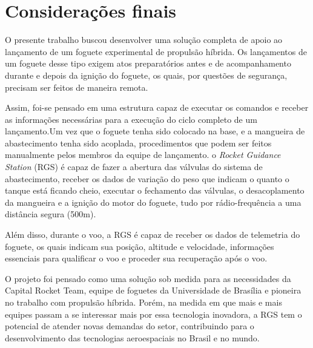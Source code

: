 \chapter{Considerações finais}

O presente trabalho buscou desenvolver uma solução completa de apoio ao lançamento de um foguete experimental de propulsão híbrida. Os lançamentos de um foguete desse tipo exigem atos preparatórios antes e de acompanhamento durante e depois da ignição do foguete, os quais, por questões de segurança, precisam ser feitos de maneira remota.
\par Assim, foi-se pensado em uma estrutura capaz de executar os comandos e receber as informações necessárias para a execução do ciclo completo de um lançamento.Um vez que o foguete tenha sido colocado na base, e a mangueira de abastecimento tenha sido acoplada, procedimentos que podem ser feitos manualmente pelos membros da equipe de lançamento. o \textit{Rocket Guidance Station} (RGS) é capaz de fazer a abertura das válvulas do sistema de abastecimento, receber os dados de variação do peso que indicam o quanto o tanque está ficando cheio, executar o fechamento das válvulas, o desacoplamento da mangueira e a ignição do motor do foguete, tudo por rádio-frequência a uma distância segura (500m).
\par Além disso, durante o voo, a RGS é capaz de receber os dados de telemetria do foguete, os quais indicam sua posição, altitude e velocidade, informações essenciais para qualificar o voo e proceder sua recuperação após o voo.
\par O projeto foi pensado como uma solução sob medida para as necessidades da Capital Rocket Team, equipe de foguetes da Universidade de Brasília e pioneira no trabalho com propulsão híbrida. Porém, na medida em que mais e mais equipes passam a se interessar mais por essa tecnologia inovadora, a RGS tem o potencial de atender novas demandas do setor, contribuindo para o desenvolvimento das tecnologias aeroespaciais no Brasil e no mundo.